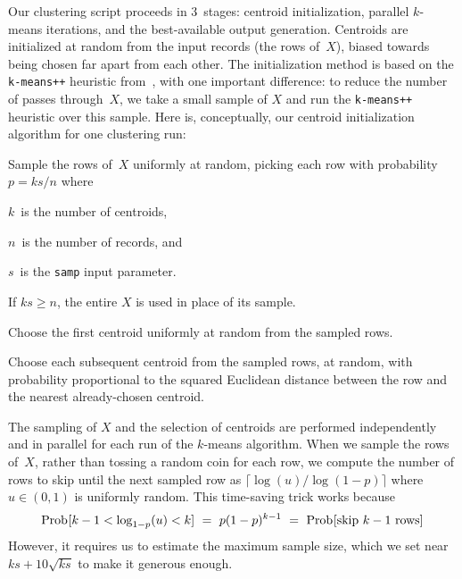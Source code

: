 Our clustering script proceeds in 3~stages: centroid initialization,
parallel $k$-means iterations, and the best-available output generation.
Centroids are initialized at random from the input records (the rows of~$X$),
biased towards being chosen far apart from each other.  The initialization
method is based on the {\tt k-means++} heuristic from~\cite{ArthurVassilvitskii2007:kmeans},
with one important difference: to reduce the number of passes through~$X$,
we take a small sample of $X$ and run the {\tt k-means++} heuristic over
this sample.  Here is, conceptually, our centroid initialization algorithm
for one clustering run:
\begin{Enumerate}
\item Sample the rows of~$X$ uniformly at random, picking each row with probability
$p = ks / n$ where
\begin{Itemize}
\item $k$~is the number of centroids, 
\item $n$~is the number of records, and
\item $s$~is the {\tt samp} input parameter.
\end{Itemize}
If $ks \geq n$, the entire $X$ is used in place of its sample.
\item Choose the first centroid uniformly at random from the sampled rows.
\item Choose each subsequent centroid from the sampled rows, at random, with
probability proportional to the squared Euclidean distance between the row and
the nearest already-chosen centroid.
\end{Enumerate}
The sampling of $X$ and the selection of centroids are performed independently
and in parallel for each run of the $k$-means algorithm.  When we sample the
rows of~$X$, rather than tossing a random coin for each row, we compute the
number of rows to skip until the next sampled row as $\lceil \log(u) / \log(1 - p) \rceil$
where $u\in (0, 1)$ is uniformly random.  This time-saving trick works because
\begin{equation*}
\mathop{\mathrm{Prob}\hspace{0.5pt}}\nolimits [k-1 < \log_{1-p}(u) < k] \,\,=\,\, p(1-p)^{k-1} \,\,=\,\,
\mathop{\mathrm{Prob}\hspace{0.5pt}}\nolimits [\textrm{skip $k-1$ rows}]
\end{equation*}
However, it requires us to estimate the maximum sample size, which we set
near~$ks + 10\sqrt{ks}$ to make it generous enough.

